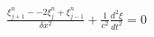 \documentclass[preview]{standalone}
\begin{document}
\begin{align*}
\frac{\xi_{j+1}^{n} - -2 \xi_{j}^{n} + \xi_{j-1}^{n}}{\delta x^2} + \frac{1}{c^2}\frac{d^2 \xi}{dt^2}  = 0
\end{align*}
\end{document}
